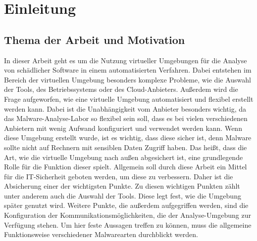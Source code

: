 \section{Einleitung} 

\subsection{Thema der Arbeit und Motivation}
In dieser Arbeit geht es um die Nutzung virtueller Umgebungen für die Analyse von schädlicher Software in einem automatisierten Verfahren. Dabei entstehen im Bereich der virtuellen Umgebung besonders komplexe Probleme, wie die Auswahl der Tools, des Betriebssystems oder des Cloud-Anbieters. Außerdem wird die Frage aufgeworfen, wie eine virtuelle Umgebung automatisiert und flexibel erstellt werden kann. Dabei ist die Unabhängigkeit vom Anbieter besonders wichtig, da das Malware-Analyse-Labor so flexibel sein soll, dass es bei vielen verschiedenen Anbietern mit wenig Aufwand konfiguriert und verwendet werden kann. 
\newline 
Wenn diese Umgebung erstellt wurde, ist es wichtig, dass diese sicher ist, denn Malware sollte nicht auf Rechnern mit sensiblen Daten Zugriff haben. Das heißt, dass die Art, wie die virtuelle Umgebung nach außen abgesichert ist, eine grundlegende Rolle für die Funktion dieser spielt. Allgemein soll durch diese Arbeit ein Mittel für die IT-Sicherheit geboten werden, um diese zu verbessern. Daher ist die Absicherung einer der wichtigsten Punkte. Zu diesen wichtigen Punkten zählt unter anderem auch die Auswahl der Tools. Diese legt fest, wie die Umgebung später genutzt wird.
\newline
Weitere Punkte, die außerdem aufgegriffen werden, sind die Konfiguration der Kommunikationsmöglichkeiten, die der Analyse-Umgebung zur Verfügung stehen. Um hier feste Aussagen treffen zu können, muss die allgemeine Funktionsweise verschiedener Malwarearten durchblickt werden.
